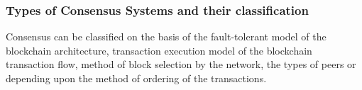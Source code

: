 \documentclass[
  a4paper,  %
  twoside,  %
  bibliography=totoc,
  headsepline,
  cleardoublepage=empty,
  parskip=half,
  draft=false
]{scrbook}
\begin{document}
\subsubsection{Types of Consensus Systems and their classification}
Consensus can be classified on the basis of the fault-tolerant model of the blockchain architecture, transaction execution model of the blockchain transaction flow, method of block selection by the network, the types of peers or depending upon the method of ordering of the transactions.

\begin{center}
\begin{table}[h]
\caption{Table showing classification of consensus types.}
\end{table}
\end{center}
\end{document}
